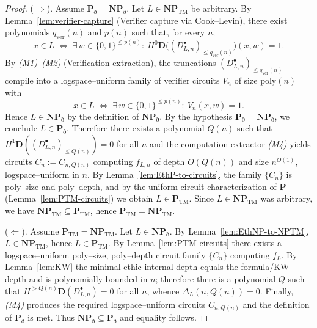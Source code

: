 \documentclass[10pt,a4paper]{amsart}
\newcommand{\HD}[2]{H^{#1}\mathbf D(#2)} %
\begin{document}
\begin{proof}
(\(\Rightarrow\)).
Assume \(\mathbf P_{\eth}=\mathbf{NP}_{\eth}\).
Let \(L\in \mathbf{NP}_{\mathrm{TM}}\) be arbitrary.
By Lemma~\ref{lem:verifier-capture} (Verifier capture via Cook--Levin), there exist polynomials \(q_{\mathrm{ver}}(n)\) and \(p(n)\) such that, for every \(n\),
\[
x\in L \;\Longleftrightarrow\; \exists\,w\in\{0,1\}^{\le p(n)}:\ 
H^{0}\mathbf D\!\big((D_{L,n}^{\bullet})_{\le q_{\mathrm{ver}}(n)}\big)(x,w)=1 .
\]
By \emph{(M1)}–\emph{(M2)} (Verification extraction), the truncations \((D_{L,n}^{\bullet})_{\le q_{\mathrm{ver}}(n)}\) compile into a logspace–uniform family of verifier circuits \(V_n\) of size \(\mathrm{poly}(n)\) with
\[
x\in L \;\Longleftrightarrow\; \exists\,w\in\{0,1\}^{\le p(n)}:\ V_n(x,w)=1 .
\]
Hence \(L\in \mathbf{NP}_{\eth}\) by the definition of \(\mathbf{NP}_{\eth}\).
By the hypothesis \(\mathbf P_{\eth}=\mathbf{NP}_{\eth}\), we conclude \(L\in \mathbf P_{\eth}\).
Therefore there exists a polynomial \(Q(n)\) such that \(\HD{1}{(D_{L,n}^{\bullet})_{\le Q(n)}}=0\) for all \(n\) and the computation extractor \emph{(M4)} yields circuits \(C_n:=C_{n,Q(n)}\) computing \(f_{L,n}\) of depth \(O(Q(n))\) and size \(n^{O(1)}\), logspace–uniform in \(n\).
By Lemma~\ref{lem:EthP-to-circuits}, the family \(\{C_n\}\) is poly–size and poly–depth, and by the uniform circuit characterization of \(\mathbf P\) (Lemma~\ref{lem:PTM-circuits}) we obtain \(L\in \mathbf P_{\mathrm{TM}}\).
Since \(L\in \mathbf{NP}_{\mathrm{TM}}\) was arbitrary, we have \(\mathbf{NP}_{\mathrm{TM}}\subseteq \mathbf P_{\mathrm{TM}}\), hence \(\mathbf P_{\mathrm{TM}}=\mathbf{NP}_{\mathrm{TM}}\).

(\(\Leftarrow\)).
Assume \(\mathbf P_{\mathrm{TM}}=\mathbf{NP}_{\mathrm{TM}}\).
Let \(L\in \mathbf{NP}_{\eth}\).
By Lemma~\ref{lem:EthNP-to-NPTM}, \(L\in \mathbf{NP}_{\mathrm{TM}}\), hence \(L\in \mathbf P_{\mathrm{TM}}\).
By Lemma~\ref{lem:PTM-circuits} there exists a logspace–uniform poly–size, poly–depth circuit family \(\{C_n\}\) computing \(f_{L}\).
By Lemma~\ref{lem:KW} the minimal ethic internal depth equals the formula/KW depth and is polynomially bounded in \(n\); therefore there is a polynomial \(Q\) such that \(H^{>Q(n)}\mathbf D(D_{L,n}^{\bullet})=0\) for all \(n\), whence \(\Delta_{L}(n,Q(n))=0\).
Finally, \emph{(M4)} produces the required logspace–uniform circuits \(C_{n,Q(n)}\) and the definition of \(\mathbf P_{\eth}\) is met.
Thus \(\mathbf{NP}_{\eth}\subseteq \mathbf P_{\eth}\) and equality follows.
\end{proof}
\end{document}
